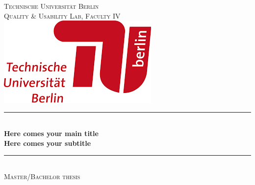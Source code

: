 \begin{titlepage}
\newcommand{\HRule}{\rule{\linewidth}{0.5mm}} %

\center %
 

\textsc{\LARGE Technische Universität Berlin}\\[0.5cm] 
\textsc{\large Quality \& Usability Lab, Faculty IV}\\[0.5cm] %

\includegraphics[scale=0.5]{figures/tub_logo.png}\\

\vspace{1cm}

\HRule \\[0.4cm]
{ \Large \bfseries Here comes your main title \vspace{0.5cm} \\
\normalsize Here comes your subtitle}\\[0.3cm] %

\HRule \\[1.5cm]
 
\textsc{\large Master/Bachelor thesis}\\[0.5cm] %
\vspace{2cm}


\end{titlepage}
